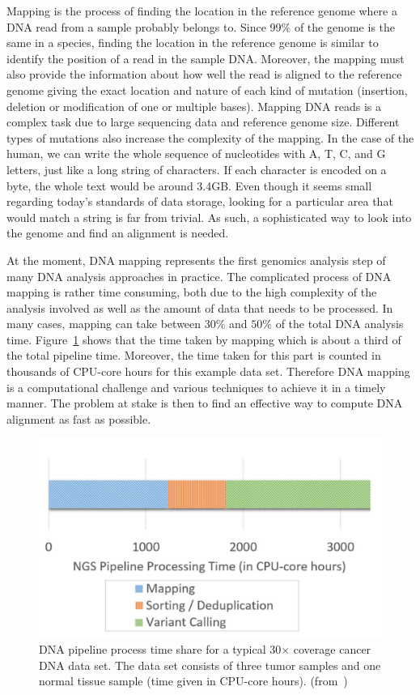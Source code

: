 Mapping is the process of finding the location in the reference genome where a DNA read from a sample probably belongs to. Since 99\% of the genome is the same in a species, finding the location in the reference genome is similar to identify the position of a read in the sample DNA. Moreover, the mapping must also provide the information about how well the read is aligned to the reference genome giving the exact location and nature of each kind of mutation (insertion, deletion or modification of one or multiple bases).  Mapping DNA reads is a complex task due to large sequencing data and reference genome size. Different types of mutations also increase the complexity of the mapping. In the case of the human, we can write the whole sequence of nucleotides with A, T, C, and G letters, just like a long string of characters. If each character is encoded on a byte, the whole text would be around 3.4GB. Even though it seems small regarding today's standards of data storage, looking for a particular area that would match a string is far from trivial. As such, a sophisticated way to look into the genome and find an alignment is needed.


At the moment, DNA mapping represents the first genomics analysis step of many DNA analysis approaches in practice. The complicated process of DNA mapping is rather time consuming, both due to the high complexity of the analysis involved as well as the amount of data that needs to be processed. In many cases, mapping can take between $30\%$ and $50\%$ of the total DNA analysis time. Figure~\ref{fig:pipelineprocesstime} shows that the time taken by mapping which is about a third of the total pipeline time. Moreover, the time taken for this part is counted in thousands of CPU-core hours for this example data set. Therefore DNA mapping is a computational challenge and various techniques to achieve it in a timely manner. The problem at stake is then to find an effective way to compute DNA alignment as fast as possible.

\begin{figure}[h]
	\centering
	\includegraphics[width=1\linewidth]{pipelineprocesstime}
	\caption{DNA pipeline process time share for a typical 30$\times$ coverage cancer DNA data set. The data set consists of three tumor samples and one normal tissue sample (time given in CPU-core hours). (from~\cite{HOUTGAST201854})}
	\label{fig:pipelineprocesstime}
\end{figure}


